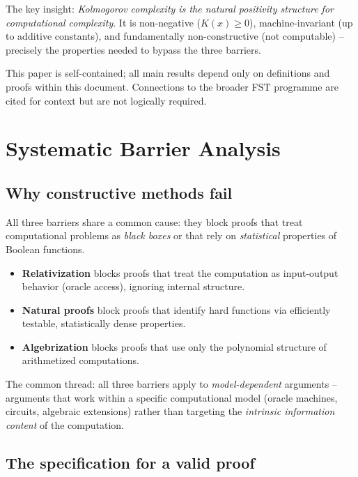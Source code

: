 \documentclass[aps,prd,twocolumn,superscriptaddress,nofootinbib]{revtex4-2}
\theoremstyle{definition}
\theoremstyle{remark}
\begin{document}
The key insight: \textit{Kolmogorov complexity is the natural positivity structure for computational complexity}. It is non-negative ($K(x) \geq 0$), machine-invariant (up to additive constants), and fundamentally non-constructive (not computable) -- precisely the properties needed to bypass the three barriers.

This paper is self-contained; all main results depend only on definitions and proofs within this document. Connections to the broader FST programme are cited for context but are not logically required.


\section{Systematic Barrier Analysis}
\label{sec:barriers}

\subsection{Why constructive methods fail}

All three barriers share a common cause: they block proofs that treat computational problems as \textit{black boxes} or that rely on \textit{statistical} properties of Boolean functions.

\begin{itemize}
\item \textbf{Relativization} blocks proofs that treat the computation as input-output behavior (oracle access), ignoring internal structure.
\item \textbf{Natural proofs} block proofs that identify hard functions via efficiently testable, statistically dense properties.
\item \textbf{Algebrization} blocks proofs that use only the polynomial structure of arithmetized computations.
\end{itemize}

The common thread: all three barriers apply to \textit{model-dependent} arguments -- arguments that work within a specific computational model (oracle machines, circuits, algebraic extensions) rather than targeting the \textit{intrinsic information content} of the computation.

\subsection{The specification for a valid proof}
\end{document}
